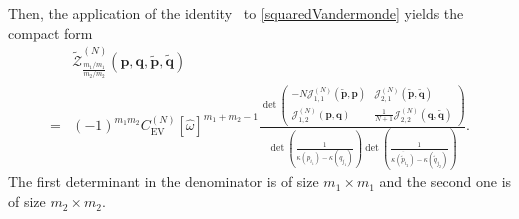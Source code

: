 \documentclass[pdflatex,sn-mathphys-num]{sn-jnl}
\theoremstyle{thmstyleone}
\numberwithin{equation}{section}
\begin{document}
Then, the application of the identity~\cite[Eq.~(4.35)]{kieburgDerivationDeterminantalStructures2010} to \eqref{squaredVandermonde} yields the compact form
\begin{align}
    &\widetilde{\mathscr{Z}}_{\frac{m_{1}/m_{1}}{m_{2}/m_{2}}}^{\left(N\right)}\left(\textbf{p},\textbf{q},\widetilde{\textbf{p}},\widetilde{\textbf{q}}\right)\nonumber\\
    =&(-1)^{m_1m_2}C_{\mathrm{EV}}^{\left ( N \right )}\left [ \widehat{\omega} \right ] ^{m_1+m_2-1}\frac{\det\left(\begin{array}{c|c}
-N\mathcal{J}^{\left(N\right)}_{1,1}\left ( \widetilde{\textbf{p}},\textbf{p} \right ) & \mathcal{J}^{\left(N\right)}_{2,1}\left ( \widetilde{\textbf{p}},\widetilde{\textbf{q}} \right ) \\ \hline
\mathcal{J}^{\left(N\right)}_{1,2}\left ( \textbf{p},\textbf{q} \right ) & \frac{1}{N+1}\mathcal{J}^{\left(N\right)}_{2,2}\left ( \textbf{q},\widetilde{\textbf{q}} \right )
\end{array}\right)}{\det\left ( \frac{1}{\kappa\left ( p_{i_{1}} \right )-\kappa\left ( q_{j_{1}} \right )} \right )\det\left ( \frac{1}{\overline{\kappa\left ( \widetilde{p}_{i_{2}} \right )}-\overline{\kappa\left ( \widetilde{q}_{j_{2}} \right )}} \right )}.\label{part.nonnorm}
\end{align}
The first determinant in the denominator is of size $m_1\times m_1$ and the second one is of size $m_2\times m_2$.
\end{document}
